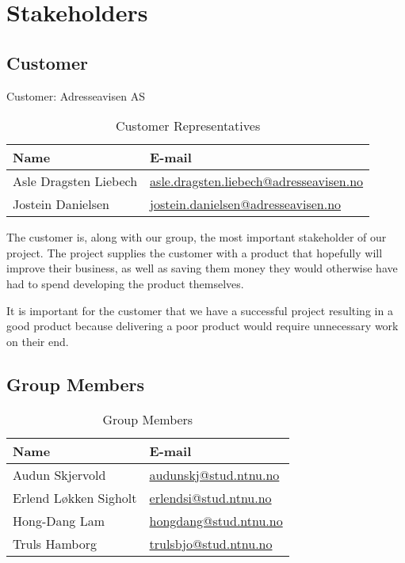 \section{Stakeholders}
\subsection{Customer}
Customer: Adresseavisen AS

\begin{table}[H]
\begin{tabular}{|l|l|}
\hline
\textbf{Name} & \textbf{E-mail} \\
\hline
Asle Dragsten Liebech & \href{mailto://asle.dragsten.liebech@adresseavisen.no}{asle.dragsten.liebech@adresseavisen.no}\\
Jostein Danielsen & \href{mailto://jostein.danielsen@adresseavisen.no}{jostein.danielsen@adresseavisen.no}\\
\hline
\end{tabular}
\caption{Customer Representatives}
\end{table}

The customer is, along with our group, the most important stakeholder of our project. The project supplies the customer with a product that hopefully will improve their business, as well as saving them money they would otherwise have had to spend developing the product themselves.

It is important for the customer that we have a successful project resulting in a good product because delivering a poor product would require unnecessary work on their end.
\subsection{Group Members}
\begin{table}[H]
\begin{tabular}{|p{5cm}|p{6cm}|}
\hline
\textbf{Name} & \textbf{E-mail} \\
\hline
Audun Skjervold & \href{mailto://audunskj@stud.ntnu.no}{audunskj@stud.ntnu.no}\\
Erlend Løkken Sigholt & \href{mailto://erlendsi@stud.ntnu.no}{erlendsi@stud.ntnu.no}\\
Hong-Dang Lam & \href{mailto://hongdang@stud.ntnu.no}{hongdang@stud.ntnu.no}\\
Truls Hamborg & \href{mailto://trulsbjo@stud.ntnu.no}{trulsbjo@stud.ntnu.no}\\
\hline
\end{tabular}
\caption{Group Members}
\end{table}

